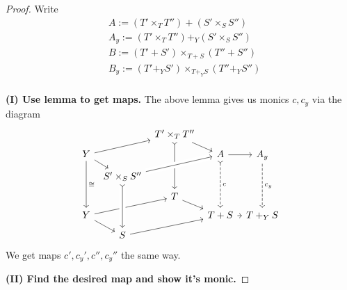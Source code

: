 \documentclass[12pt]{article}
\renewcommand{\(}{\left(}
\renewcommand{\)}{\right)}
\renewcommand{\{}{\left\lbrace}
\renewcommand{\}}{\right\rbrace}
\theoremstyle{remark}
\theoremstyle{definition}
\begin{document}
 \begin{proof}
 	Write
 	\begin{align*}
	 	&A := (T' \times_T T'') + (S'\times_SS'') \\
	 	&A_y  := (T' \times_T T'') +_Y (S'\times_SS'') \\
	 	&B  := (T'+S') \times_{T+S} (T''+S'') \\ 
	 	&B_y := (T'+_YS') \times_{T+_YS} (T''+_YS'') \\
 	\end{align*}
 	
 	
 	\textbf{(I) Use lemma to get maps.}  The above lemma gives us monics $c,c_y$ via the diagram
 	\[
 	\begin{tikzcd}[column sep=.5em,row sep=.5em]
	 	{} &
	 	{} &
	 	{T'\times_TT''} \ar[dr] \ar[ddd,rightarrowtail]&
	 	{} &
	 	{} \\
	 	{Y} \ar[rru] \ar[rd] \ar[ddd,"\cong"]&
	 	{} &
	 	{} &
	 	{A} \ar[ddd,dashed,rightarrowtail, "c"] \ar[r] &
	 	{A_y} \ar[ddd,dashed,"c_y"]\\
	 	{} &
	 	{S'\times_SS''} \ar[rru,crossing over] &
	 	{} &
	 	{} &
	 	{} \\
	 	{} &
	 	{} &
	 	{T} \ar[dr]&
	 	{} &
	 	{} \\
	 	{Y} \ar[rru] \ar[rd]&
	 	{} &
	 	{} &
	 	{T+S} \ar[r]&
	 	{T+_YS} \\
	 	{} &
	 	{S} \ar[rru] &
	 	{} &
	 	{} &
	 	{} 
	 	\ar[from=3-2,to=6-2,rightarrowtail,crossing over]
 	\end{tikzcd}
 	\]
 	We get maps $c',c_y',c'',c_y''$ the same way.
 	
 	
 	\textbf{(II) Find the desired map and show it's monic.} 
 	

\end{proof}
\end{document}
